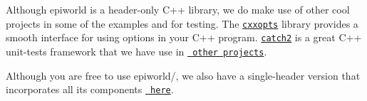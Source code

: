 \label{index_md_include_README}%
%
 Although {\ttfamily epiworld} is a header-\/only C++ library, we do make use of other cool projects in some of the examples and for testing. The \href{https://github.com/jarro2783/cxxopts}{\texttt{ {\ttfamily cxxopts}}} library provides a smooth interface for using options in your C++ program. \href{https://github.com/catchorg/Catch2}{\texttt{ {\ttfamily catch2}}} is a great C++ unit-\/tests framework that we have use in \href{https://github.com/USCbiostats/barry}{\texttt{ other projects}}.

Although you are free to use {\ttfamily epiworld/}, we also have a single-\/header version that incorporates all its components \href{../epiworld.hpp}{\texttt{ here}}. 
